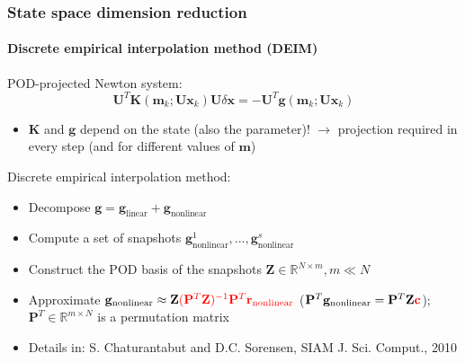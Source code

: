 \documentclass{beamer}
\begin{document}
\begin{frame}
  \frametitle{State space dimension reduction}
  \framesubtitle{Discrete empirical interpolation method (DEIM)}

  \begin{block}{POD-projected Newton system:}
    \[
      \mathbf{U}^T
      \mathbf{K}(\mathbf{m}_k; \mathbf{U} \mathbf{x}_k)
      \mathbf{U} \delta \mathbf{x}
      = -
      \mathbf{U}^T \mathbf{g} (\mathbf{m}_k; \mathbf{U} \mathbf{x}_k)
    \]
    \vspace{-0.5cm}
    \begin{itemize}
      \item $\mathbf{K}$ and $\mathbf{g}$ depend on the state (also the
        parameter)! $\rightarrow$ projection required in every step (and for
        different values of $\mathbf{m}$)
    \end{itemize}
  \end{block}


  \begin{block}{Discrete empirical interpolation method:}
    \begin{itemize}
      \item Decompose $\mathbf{g} = \mathbf{g}_\text{linear} +
        \mathbf{g}_\text{nonlinear}$
      \item Compute a set of snapshots $\mathbf{g}_\text{nonlinear}^1, \ldots,
        \mathbf{g}_\text{nonlinear}^s$
      \item Construct the POD basis of the snapshots $\mathbf{Z} \in
        \mathbb{R}^{N \times m}, m \ll N$
      \item Approximate $\mathbf{g}_\text{nonlinear} \approx \mathbf{Z}
        \textcolor{red}{(\mathbf{P}^T \mathbf{Z})^{-1} \mathbf{P}^T
        \mathbf{r}_\text{nonlinear}}$ ($\mathbf{P}^T \mathbf{g}_\text{nonlinear}
        = \mathbf{P}^T \mathbf{Z} \textcolor{red}{\mathbf{c}}$); $\mathbf{P}^T \in \mathbb{R}^{m \times
        N}$ is a permutation matrix
    \end{itemize}

    \begin{itemize}
      \item[] \scriptsize{Details in: S. Chaturantabut and D.C. Sorensen, SIAM J.
        Sci. Comput., 2010}
    \end{itemize}
  \end{block} 
\end{frame}
\end{document}
